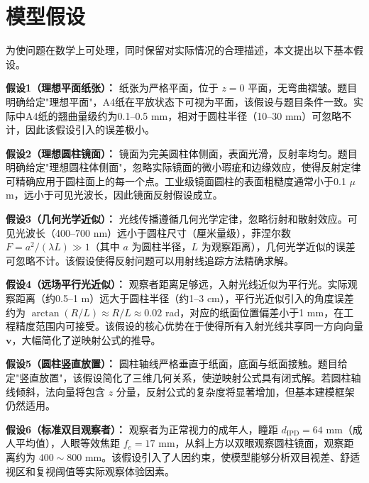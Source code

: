\clearpage
\section{模型假设}

为使问题在数学上可处理，同时保留对实际情况的合理描述，本文提出以下基本假设。

\textbf{假设1（理想平面纸张）：} 纸张为严格平面，位于 $z=0$ 平面，无弯曲褶皱。题目明确给定"理想平面"，A4纸在平放状态下可视为平面，该假设与题目条件一致。实际中A4纸的翘曲量级约为0.1--0.5 mm，相对于圆柱半径（10--30 mm）可忽略不计，因此该假设引入的误差极小。

\textbf{假设2（理想圆柱镜面）：} 镜面为完美圆柱体侧面，表面光滑，反射率均匀。题目明确给定"理想圆柱体侧面"，忽略实际镜面的微小瑕疵和边缘效应，使得反射定律可精确应用于圆柱面上的每一个点。工业级镜面圆柱的表面粗糙度通常小于0.1 $\mu$m，远小于可见光波长，因此镜面反射假设成立。

\textbf{假设3（几何光学近似）：} 光线传播遵循几何光学定律，忽略衍射和散射效应。可见光波长（400--700 nm）远小于圆柱尺寸（厘米量级），菲涅尔数 $F = a^2/(\lambda L) \gg 1$（其中 $a$ 为圆柱半径，$L$ 为观察距离），几何光学近似的误差可忽略不计。该假设使得反射问题可以用射线追踪方法精确求解。

\textbf{假设4（远场平行光近似）：} 观察者距离足够远，入射光线近似为平行光。实际观察距离（约0.5--1 m）远大于圆柱半径（约1--3 cm），平行光近似引入的角度误差约为 $\arctan(R/L) \approx R/L \approx 0.02$ rad，对应的纸面位置偏差小于1 mm，在工程精度范围内可接受。该假设的核心优势在于使得所有入射光线共享同一方向向量 $\boldsymbol{v}$，大幅简化了逆映射公式的推导。

\textbf{假设5（圆柱竖直放置）：} 圆柱轴线严格垂直于纸面，底面与纸面接触。题目给定"竖直放置"，该假设简化了三维几何关系，使逆映射公式具有闭式解。若圆柱轴线倾斜，法向量将包含 $z$ 分量，反射公式的复杂度将显著增加，但基本建模框架仍然适用。

\textbf{假设6（标准双目观察者）：} 观察者为正常视力的成年人，瞳距 $d_{\text{IPD}} = 64$ mm（成人平均值），人眼等效焦距 $f_e = 17$ mm，从斜上方以双眼观察圆柱镜面，观察距离约为 $400\sim800$ mm。该假设引入了人因约束，使模型能够分析双目视差、舒适视区和复视阈值等实际观察体验因素。

